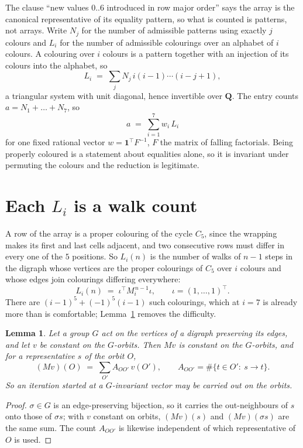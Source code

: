 \documentclass[11pt,a4paper]{article}
\theoremstyle{plain}
\newtheorem{lemma}[theorem]{Lemma}
\theoremstyle{definition}
\begin{document}
The clause ``new values $0..6$ introduced in row major order'' says the array is the
canonical representative of its equality pattern, so what is counted is patterns, not arrays.
Write $N_j$ for the number of admissible patterns using exactly $j$ colours and $L_i$ for the
number of admissible colourings over an alphabet of $i$ colours. A colouring over $i$ colours
is a pattern together with an injection of its colours into the alphabet, so
\[
L_i\;=\;\sum_j N_j\,i(i-1)\cdots(i-j+1),
\]
a triangular system with unit diagonal, hence invertible over $\mathbf{Q}$. The entry counts
$a=N_1+\dots+N_{7}$, so
\[
a\;=\;\sum_{i=1}^{7}w_i\,L_i
\]
for one fixed rational vector $w=\mathbf{1}^{\!\top}F^{-1}$, $F$ the matrix of falling
factorials. Being properly coloured is a statement about equalities alone, so it is invariant
under permuting the colours and the reduction is legitimate.

\section{Each $L_i$ is a walk count}

A row of the array is a proper colouring of the cycle $C_{5}$, since the wrapping makes
its first and last cells adjacent, and two consecutive rows must differ in every one of the
$5$ positions. So $L_i(n)$ is the number of walks of $n-1$ steps in the digraph whose
vertices are the proper colourings of $C_{5}$ over $i$ colours and whose edges join
colourings differing everywhere:
\[
L_i(n)\;=\;\iota^{\!\top}M_i^{\,n-1}\iota ,\qquad \iota=(1,\dots,1)^{\!\top} .
\]
There are $(i-1)^{5}+(-1)^{5}(i-1)$ such colourings, which at $i=7$ is already more
than is comfortable; Lemma~\ref{lem:lump} removes the difficulty.

\begin{lemma}\label{lem:lump}
Let a group $G$ act on the vertices of a digraph preserving its edges, and let $v$ be constant
on the $G$-orbits. Then $Mv$ is constant on the $G$-orbits, and for a representative $s$ of
the orbit $O$,
\[
(Mv)(O)\;=\;\sum_{O'}A_{OO'}\,v(O'),\qquad
A_{OO'}=\#\{t\in O':\ s\to t\} .
\]
So an iteration started at a $G$-invariant vector may be carried out on the orbits.
\end{lemma}

\begin{proof}
$\sigma\in G$ is an edge-preserving bijection, so it carries the out-neighbours of $s$ onto
those of $\sigma s$; with $v$ constant on orbits, $(Mv)(s)$ and $(Mv)(\sigma s)$ are the same
sum. The count $A_{OO'}$ is likewise independent of which representative of $O$ is used.
\end{proof}
\end{document}
